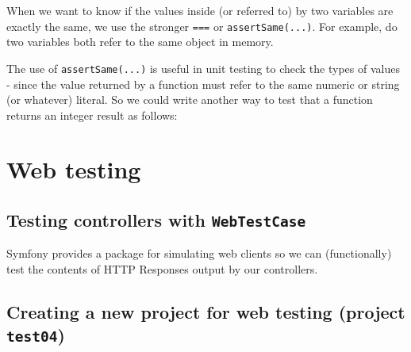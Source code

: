 \documentclass[a4paperpaper,openright]{book}
\newenvironment{Shaded}{}{}
\newcommand{\CommentTok}[1]{\textcolor[rgb]{0.38,0.63,0.69}{\textit{#1}}}
\newcommand{\DecValTok}[1]{\textcolor[rgb]{0.25,0.63,0.44}{#1}}
\newcommand{\KeywordTok}[1]{\textcolor[rgb]{0.00,0.44,0.13}{\textbf{#1}}}
\newcommand{\NormalTok}[1]{#1}
\newcommand{\OtherTok}[1]{\textcolor[rgb]{0.00,0.44,0.13}{#1}}
\begin{document}
When we want to know if the values inside (or referred to) by two
variables are exactly the same, we use the stronger \texttt{===} or
\texttt{assertSame(...)}. For example, do two variables both refer to
the same object in memory.

The use of \texttt{assertSame(...)} is useful in unit testing to check
the types of values - since the value returned by a function must refer
to the same numeric or string (or whatever) literal. So we could write
another way to test that a function returns an integer result as
follows:

\begin{Shaded}
\end{Shaded}

\hypertarget{web-testing}{%
\chapter{Web testing}\label{web-testing}}

\hypertarget{testing-controllers-with-webtestcase}{%
\section{\texorpdfstring{Testing controllers with
\texttt{WebTestCase}}{Testing controllers with WebTestCase}}\label{testing-controllers-with-webtestcase}}

Symfony provides a package for simulating web clients so we can
(functionally) test the contents of HTTP Responses output by our
controllers.

\hypertarget{creating-a-new-project-for-web-testing-project-test04}{%
\section{\texorpdfstring{Creating a new project for web testing (project
\texttt{test04})}{Creating a new project for web testing (project test04)}}\label{creating-a-new-project-for-web-testing-project-test04}}
\end{document}
